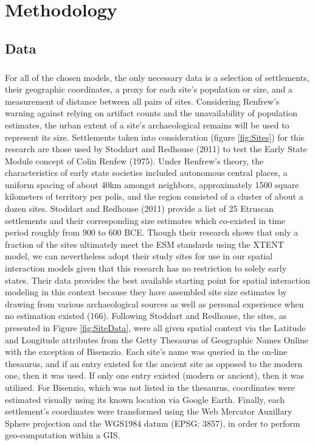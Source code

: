 \documentclass[12pt,a4paper]{thesis}
\begin{document}
\chapter{Methodology}
\section{Data}

\paragraph{}
For all of the chosen models, the only necessary data is a selection of settlements, their geographic coordinates, a proxy for each site's population or size, and a measurement of distance between all pairs of sites. Considering Renfrew's warning against relying on artifact counts and the unavailability of population estimates, the urban extent of a site's archaeological remains will be used to represent its size. Settlements taken into consideration (figure \ref{fig:Sites}) for this research are those used by Stoddart and Redhouse (2011) to test the Early State Module concept of Colin Renfew (1975). Under Renfrew's theory, the characteristics of early state societies included autonomous central places,  a uniform spacing of about 40km amongst neighbors, approximately 1500 square kilometers of territory per polis, and the region consisted of a cluster of about a dozen sites. Stoddart and Redhouse (2011) provide a list of 25 Etruscan settlements and their corresponding size estimates which co-existed in time period roughly from 900 to 600 BCE. Though their research shows that only a fraction of the sites ultimately meet the ESM standards using the XTENT model, we can nevertheless adopt their study sites for use in our spatial interaction models given that this research has no restriction to solely early states. Their data provides the best available starting point for spatial interaction modeling in this context because they have assembled site size estimates by drawing from various archaeological sources as well as personal experience when no estimation existed (166). Following Stoddart and Redhouse, the sites, as presented in Figure \ref{fig:SiteData}, were all given spatial context via the Latitude and Longitude attributes from the Getty Thesaurus of Geographic Names Online with the exception of Bisenszio. Each site's name was queried in the on-line thesaurus, and if an entry existed for the ancient site as opposed to the modern one, then it was used. If only one entry existed (modern or ancient), then it was utilized. For Bisenzio, which was not listed in the thesaurus, coordinates were estimated visually using its known location via Google Earth. Finally, each settlement's coordinates were transformed using the Web Mercator Auxillary Sphere projection and the WGS1984 datum (EPSG: 3857), in order to perform geo-computation within a GIS.
\end{document}
